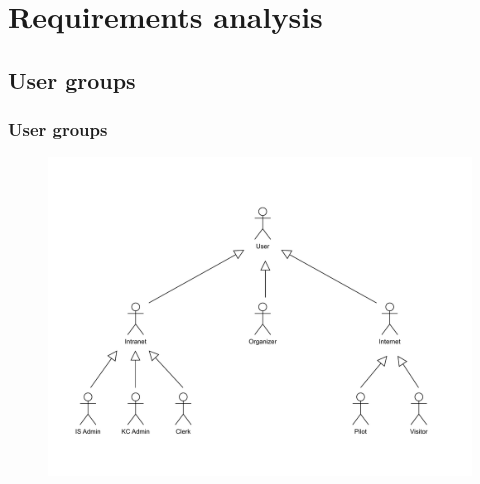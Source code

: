 \documentclass{beamer}
\begin{document}
\section{Requirements analysis}

\subsection{User groups}

\begin{frame}
\frametitle{User groups}
\begin{figure}
    \centering
    \includegraphics[width=0.8\linewidth]{drawio/users-uc.pdf}
\end{figure}
\end{frame}
\end{document}
